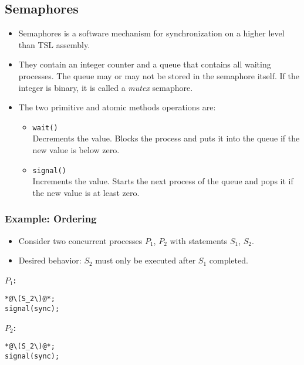\documentclass[a4paper, 11pt, accentcolor = tud3b]{tudreport}
\begin{document}
            \subsection{Semaphores}
                \begin{itemize}
                	\item Semaphores is a software mechanism for synchronization on a higher level than TSL assembly.
                	\item They contain an integer counter and a queue that contains all waiting processes. The queue may or may not be stored in the semaphore itself. If the integer is binary, it is called a \textit{mutex} semaphore.
                	\item The two primitive and atomic methods operations are:
	                	\begin{itemize}
	                		\item \texttt{wait()} \\ Decrements the value. Blocks the process and puts it into the queue if the new value is below zero.
	                		\item \texttt{signal()} \\ Increments the value. Starts the next process of the queue and pops it if the new value is at least zero.
	                	\end{itemize}
                \end{itemize}

                \subsubsection{Example: Ordering}
                    \begin{itemize}
                    	\item Consider two concurrent processes \(P_1\), \(P_2\) with statements \(S_1\), \(S_2\).
                    	\item Desired behavior: \(S_2\) must only be executed after \(S_1\) completed.
                    \end{itemize}
                
	                \textbf{\(P_1\):}
	                \begin{lstlisting}
*@\(S_2\)@*;
signal(sync);
\end{lstlisting}
	                
	                \textbf{\(P_2\):}
	                \begin{lstlisting}
*@\(S_2\)@*;
signal(sync);
\end{lstlisting}
\end{document}
